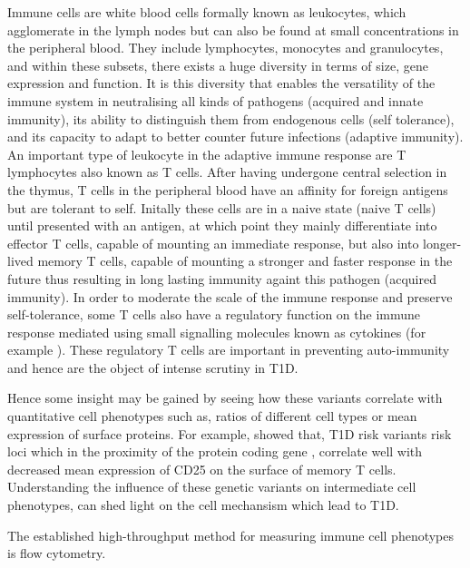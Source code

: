 Immune cells are white blood cells formally known as leukocytes, which agglomerate in the lymph nodes but can also be found at small concentrations in the peripheral blood.
They include lymphocytes, monocytes and granulocytes, and within these subsets, there exists a huge diversity in terms of size, gene expression and function.
It is this diversity that enables the versatility of the immune system in neutralising all kinds of pathogens (acquired and innate immunity),
its ability to distinguish them from endogenous cells (self tolerance),
and its capacity to adapt to better counter future infections (adaptive immunity).
An important type of leukocyte in the adaptive immune response are T lymphocytes also known as T cells.
After having undergone central selection in the thymus,
T cells in the peripheral blood have an affinity for foreign antigens but are tolerant to self.
Initally these cells are in a naive state (naive T cells) until presented with an antigen,
at which point they mainly differentiate into effector T cells, capable of mounting an immediate response,
but also into longer-lived memory T cells, capable of mounting a stronger and faster response in the future thus
resulting in long lasting immunity againt this pathogen (acquired immunity).
In order to moderate the scale of the immune response and preserve self-tolerance, some T cells also have a regulatory function on the immune response
mediated using small signalling molecules known as cytokines (for example ).
These regulatory T cells are important in preventing auto-immunity and hence are the object of intense scrutiny in T1D.

Hence some insight may be gained by seeing how these variants correlate with quantitative cell phenotypes such as, 
ratios of different cell types or mean expression of surface proteins.
For example, \citet{Dendrou:2009dv} showed that, T1D risk variants risk loci which in the proximity of the protein coding gene ,
correlate well with decreased mean expression of CD25 on the surface of memory T cells.
Understanding the influence of these genetic variants on intermediate cell phenotypes, can shed light on the cell mechansism which lead to T1D.

The established high-throughput method for measuring immune cell phenotypes is flow cytometry.

